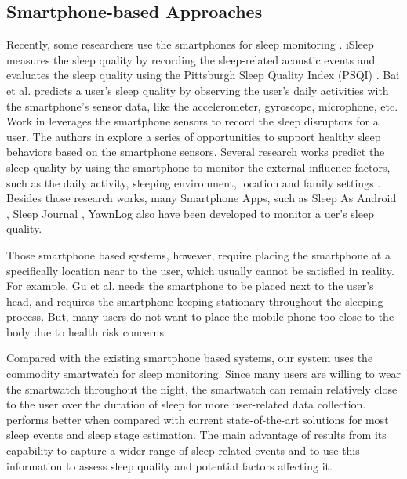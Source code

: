 \subsection{Smartphone-based Approaches}
Recently, some researchers use the smartphones for sleep monitoring \cite{hao2013isleep,bai2012will,kay2012lullaby,choe2011opportunities} . iSleep \cite{hao2013isleep} measures the sleep quality by recording the sleep-related acoustic events and evaluates the sleep quality using the Pittsburgh Sleep Quality Index (PSQI) \cite{carpenter1998psychometric}. Bai et al. \cite{bai2012will} predicts a user's sleep quality by observing the user's daily activities with the smartphone's sensor data, like the accelerometer, gyroscope, microphone, etc. Work in \cite{kay2012lullaby} leverages the smartphone sensors to record the sleep disruptors for a user. The authors in \cite{choe2011opportunities}  explore a series of opportunities to support healthy sleep behaviors based on the smartphone sensors. Several research works predict the sleep quality by using the smartphone to monitor the external  influence  factors, such as the daily activity, sleeping environment, location and family settings \cite{chen2013unobtrusive,zhang2013real}. Besides those research works, many Smartphone Apps, such as Sleep As Android \cite{SleepAndroid}, Sleep Journal \cite{SleepJournal}, YawnLog \cite{YawnLog} also have been developed to monitor a uer's sleep quality.

Those smartphone based systems, however, require placing the smartphone at a specifically location near to the user, which usually cannot be satisfied in reality. For example, Gu et al. \cite{gu2016sleep} needs the smartphone to be placed next to the user's head, and requires the smartphone keeping stationary throughout the sleeping process. But, many users do not want to place the mobile phone too close to the body due to health risk concerns  \cite{StepHealth,Quorasleep}.

Compared with the existing smartphone based systems, our system uses the commodity smartwatch for sleep monitoring. Since many users are willing to wear the smartwatch throughout the night, the smartwatch can remain relatively close to the user over the duration of sleep for more user-related data collection. {\systemname} performs better  when compared with current state-of-the-art solutions for most sleep events and sleep stage estimation. The main advantage of {\systemname} results from its capability to capture a wider range of sleep-related events and to use this information to assess sleep quality and potential factors affecting it.

